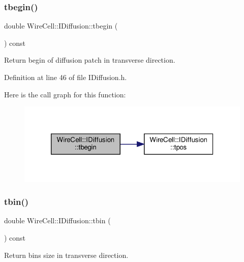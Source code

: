 \subsubsection{\texorpdfstring{tbegin()}{tbegin()}}
{\footnotesize\ttfamily double Wire\+Cell\+::\+I\+Diffusion\+::tbegin (\begin{DoxyParamCaption}{ }\end{DoxyParamCaption}) const\hspace{0.3cm}{\ttfamily [inline]}}



Return begin of diffusion patch in transverse direction. 



Definition at line 46 of file I\+Diffusion.\+h.

Here is the call graph for this function\+:
\nopagebreak
\begin{figure}[H]
\begin{center}
\leavevmode
\includegraphics[width=320pt]{class_wire_cell_1_1_i_diffusion_ae1a5b7ca2e573661e358b604c9b3adfc_cgraph}
\end{center}
\end{figure}
\mbox{\label{class_wire_cell_1_1_i_diffusion_abf2ecc1831078625a9f0fd439d773ce8}} 
\subsubsection{\texorpdfstring{tbin()}{tbin()}}
{\footnotesize\ttfamily double Wire\+Cell\+::\+I\+Diffusion\+::tbin (\begin{DoxyParamCaption}{ }\end{DoxyParamCaption}) const\hspace{0.3cm}{\ttfamily [inline]}}



Return bins size in transverse direction. 



